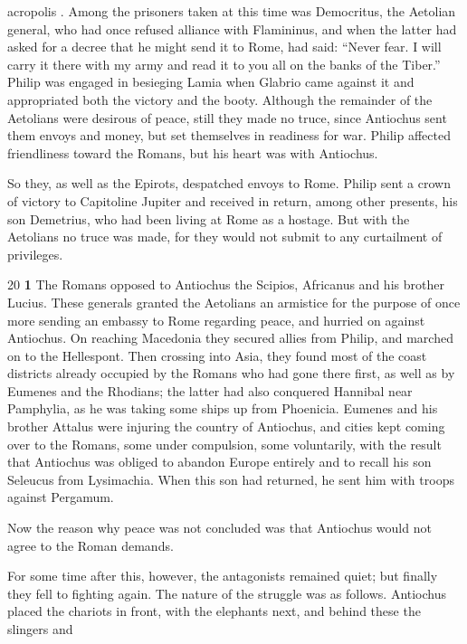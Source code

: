 acropolis . Among the prisoners taken at this time was Democritus, the Aetolian general, who had once refused alliance with Flamininus, and when the latter had asked for a decree that he might send it to Rome, had said: ``Never fear. I will carry it there with my army and read it to you all on the banks of the Tiber.'' Philip was engaged in besieging Lamia when Glabrio came against it and appropriated both the victory and the booty. Although the remainder of the Aetolians were desirous of peace, still they made no truce, since Antiochus sent them envoys and money, but set themselves in readiness for war. Philip affected friendliness toward the Romans, but his heart was with Antiochus.

So they, as well as the Epirots, despatched envoys to Rome. Philip sent a crown of victory to Capitoline Jupiter and received in return, among other presents, his son Demetrius, who had been living at Rome as a hostage. But with the Aetolians no truce was made, for they would not submit to any curtailment of privileges.

20
\textbf{1} The Romans opposed to Antiochus the Scipios, Africanus and his brother Lucius. These generals granted the Aetolians an armistice for the purpose of once more sending an embassy to Rome regarding peace, and hurried on against Antiochus. On reaching Macedonia they secured allies from Philip, and marched on to the Hellespont. Then crossing into Asia, they found most of the coast districts already occupied by the Romans who had gone there first, as well as by Eumenes and the Rhodians; the latter had also conquered Hannibal near Pamphylia, as he was taking some ships up from Phoenicia. Eumenes and his brother Attalus were injuring the country of Antiochus, and cities kept coming over to the Romans, some under compulsion, some voluntarily, with the result that Antiochus was obliged to abandon Europe entirely and to recall his son Seleucus from Lysimachia. When this son had returned, he sent him with troops against Pergamum.

Now the reason why peace was not concluded was that Antiochus would not agree to the Roman demands.

For some time after this, however, the antagonists remained quiet; but finally they fell to fighting again. The nature of the struggle was as follows. Antiochus placed the chariots in front, with the elephants next, and behind these the slingers and

